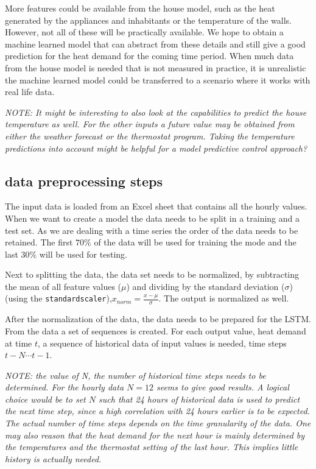 More features could be available from the house model, such as the heat generated by the appliances and inhabitants or the temperature of the walls. However, not all of these will be practically available. We hope to obtain a machine learned model that can abstract from these details and still give a good prediction for the heat demand for the coming time period. When much data from the house model is needed that is not measured in practice, it is unrealistic the machine learned model could be transferred to a scenario where it works with real life data.  

\textit{NOTE: It might be interesting to also look at the capabilities to predict the house temperature as well. For the other inputs a future value may be obtained from either the weather forecast or the thermostat program. Taking the temperature predictions into account might be helpful for a model predictive control approach?}

\subsection{data preprocessing steps}
The input data is loaded from an Excel sheet that contains all the hourly values. When we want to create a model the data needs to be split in a training and a test set. As we are dealing with a time series the order of the data needs to be retained. The first $70\%$ of the data will be used for training the mode and the last $30\%$ will be used for testing. 

Next to splitting the data, the data set needs to be normalized, by subtracting the mean of all feature values ($\mu$) and dividing by the standard deviation ($\sigma$) (using the \texttt{standardscaler}),$x_{norm}= \frac{x-\mu}{\sigma}$. The output is normalized as well.

After the normalization of the data, the data needs to be prepared for the LSTM. From the data a set of sequences is created. For each output value, heat demand at time $t$, a sequence of historical data of input values is needed, time steps $t-N \cdots t-1$.  

\textit{NOTE: the value of N, the number of historical time steps needs to be determined. For the hourly data $N=12$ seems to give good results. A logical choice would be to set $N$ such that 24 hours of historical data is used to predict the next time step, since a high correlation with 24 hours earlier is to be expected. The actual number of time steps depends on the time granularity of the data. 
One may also reason that the heat demand for the next hour is mainly determined by the temperatures and the thermostat setting of the last hour. This implies little history is actually needed.} 

